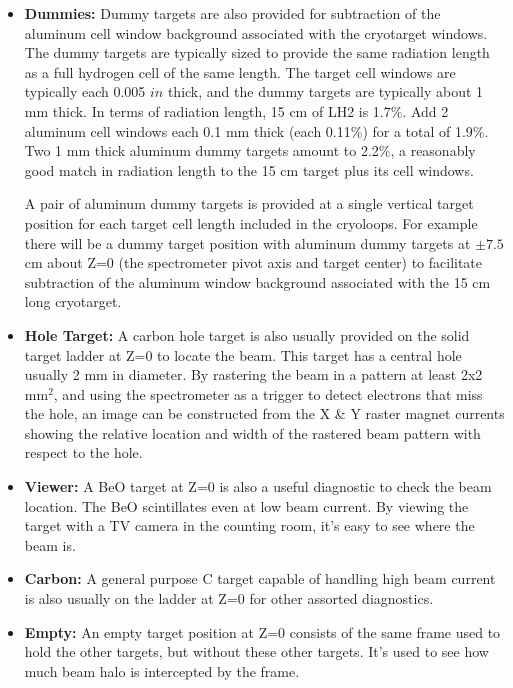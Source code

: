 {\begin{itemize}
\item {\bf Dummies:} Dummy targets are also provided for subtraction
  of the aluminum cell window background associated with the
  cryotarget windows. The dummy targets are typically sized to provide
  the same radiation length as a full hydrogen cell of the same
  length. The target cell windows are typically each 0.005 $in$ thick,
  and the dummy targets are typically about 1 mm thick. In terms of
  radiation length, 15 cm of LH2 is 1.7\%. Add 2 aluminum cell windows
  each 0.1 mm thick (each 0.11\%) for a total of 1.9\%. Two 1 mm thick
  aluminum dummy targets amount to 2.2\%, a reasonably good match in
  radiation length to the 15 cm target plus its cell windows.

A pair of aluminum dummy targets is provided at a single vertical
target position for each target cell length included in the
cryoloops. For example there will be a dummy target position with
aluminum dummy targets at $\pm 7.5$ cm about Z=0 (the spectrometer
pivot axis and target center) to facilitate subtraction of the
aluminum window background associated with the 15 cm long cryotarget.

\item {\bf Hole Target:} A carbon hole target is also usually provided
  on the solid target ladder at Z=0 to locate the beam. This target
  has a central hole usually 2 mm in diameter. By rastering the beam
  in a pattern at least 2x2 mm$^2$, and using the spectrometer as a
  trigger to detect electrons that miss the hole, an image can be
  constructed from the X \& Y raster magnet currents showing the
  relative location and width of the rastered beam pattern with
  respect to the hole.

\item {\bf Viewer:} A BeO target at Z=0 is also a useful diagnostic to
  check the beam location. The BeO scintillates even at low beam
  current. By viewing the target with a TV camera in the counting
  room, it's easy to see where the beam is.

\item {\bf Carbon:} A general purpose C target capable of handling
  high beam current is also usually on the ladder at Z=0 for other
  assorted diagnostics.

\item {\bf Empty:} An empty target position at Z=0 consists of the
  same frame used to hold the other targets, but without these other
  targets. It's used to see how much beam halo is intercepted by the
  frame.


\end{itemize}}
